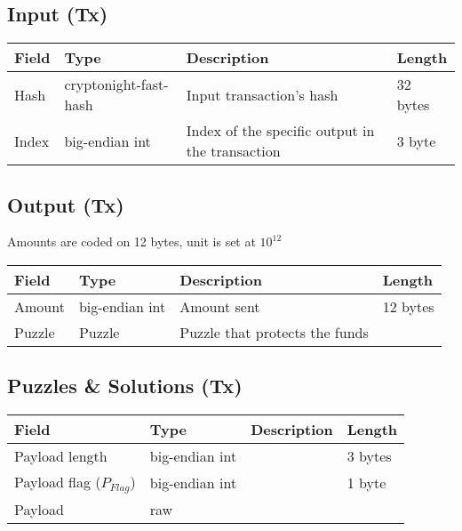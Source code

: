\documentclass[a4paper,10pt]{article}
\begin{document}
        
        \subsection{Input (Tx)}
            \begin{tabularx}{\textwidth}{|l|l|X|l|}
            \hline Field & Type & Description & Length \\ \hline
            \hline Hash & cryptonight-fast-hash & Input transaction's hash & 32 bytes \\
            \hline Index & big-endian int & Index of the specific output in the transaction & 3 byte \\
            \hline 
            \end{tabularx}

        \subsection{Output (Tx)}
            Amounts are coded on 12 bytes, unit is set at $10^{12}$ \\
            
            \begin{tabularx}{\textwidth}{|l|l|X|l|}
            \hline Field & Type & Description & Length \\ \hline
            \hline Amount & big-endian int & Amount sent & 12 bytes \\
            \hline Puzzle & Puzzle & Puzzle that protects the funds & \\
            \hline 
            \end{tabularx}

        \subsection{Puzzles \& Solutions (Tx)}
            \begin{tabularx}{\textwidth}{|l|l|X|l|}
            \hline Field & Type & Description & Length \\ \hline
            \hline Payload length & big-endian int &  & 3 bytes \\
            \hline Payload flag ($P_{Flag}$) & big-endian int &  & 1 byte \\
            \hline Payload & raw & & \\
            \hline
            \end{tabularx}
\end{document}
